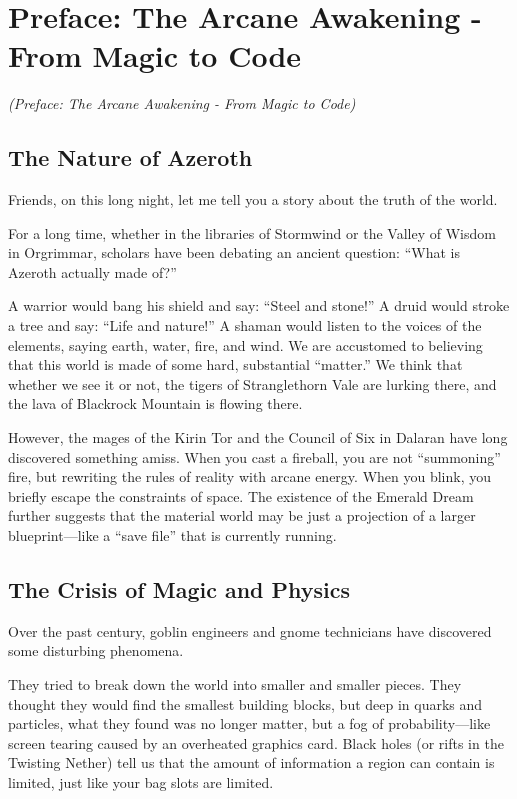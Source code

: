 \section*{Preface: The Arcane Awakening - From Magic to Code}

\textit{(Preface: The Arcane Awakening - From Magic to Code)}

\subsection*{The Nature of Azeroth}

Friends, on this long night, let me tell you a story about the truth of the world.

For a long time, whether in the libraries of Stormwind or the Valley of Wisdom in Orgrimmar, scholars have been debating an ancient question: ``What is Azeroth actually made of?''

A warrior would bang his shield and say: ``Steel and stone!'' A druid would stroke a tree and say: ``Life and nature!'' A shaman would listen to the voices of the elements, saying earth, water, fire, and wind. We are accustomed to believing that this world is made of some hard, substantial ``matter.'' We think that whether we see it or not, the tigers of Stranglethorn Vale are lurking there, and the lava of Blackrock Mountain is flowing there.

However, the mages of the Kirin Tor and the Council of Six in Dalaran have long discovered something amiss. When you cast a fireball, you are not ``summoning'' fire, but rewriting the rules of reality with arcane energy. When you blink, you briefly escape the constraints of space. The existence of the Emerald Dream further suggests that the material world may be just a projection of a larger blueprint---like a ``save file'' that is currently running.

\subsection*{The Crisis of Magic and Physics}

Over the past century, goblin engineers and gnome technicians have discovered some disturbing phenomena.

They tried to break down the world into smaller and smaller pieces. They thought they would find the smallest building blocks, but deep in quarks and particles, what they found was no longer matter, but a fog of probability---like screen tearing caused by an overheated graphics card. Black holes (or rifts in the Twisting Nether) tell us that the amount of information a region can contain is limited, just like your bag slots are limited.

